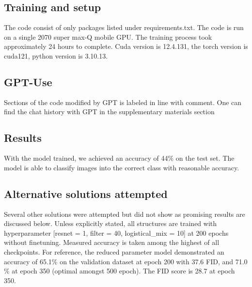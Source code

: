 \documentclass{article}
\begin{document}
\subsection{Training and setup}
The code consist of only packages listed under requirements.txt. The code is run on a single 2070 super max-Q mobile GPU. The training process took approximately 24 hours to complete. Cuda version is 12.4.131, the torch version is cuda121, python version is 3.10.13. 

\subsection{GPT-Use}
Sections of the code modified by GPT is labeled in line with comment. One can find the chat history with GPT in the supplementary materials section

\subsection{Results}
With the model trained, we achieved an accuracy of 44\% on the test set. The model is able to classify images into the correct class with reasonable accuracy.

\subsection{Alternative solutions attempted}

Several other solutions were attempted but did not show as promising results are discussed below. Unless explicitly stated, all structures are trained with hyperparameter [resnet = 1, filter = 40, logistical\_mix = 10] at 200 epochs without finetuning. Measured accuracy is taken among the highest of all checkpoints. For reference, the reduced parameter model demonstrated an accuracy of 65.1\% on the validation dataset at epoch 200 with 37.6 FID, and 71.0 \% at epoch 350 (optimal amongst 500 epoch). The FID score is 28.7 at epoch 350.
\end{document}
